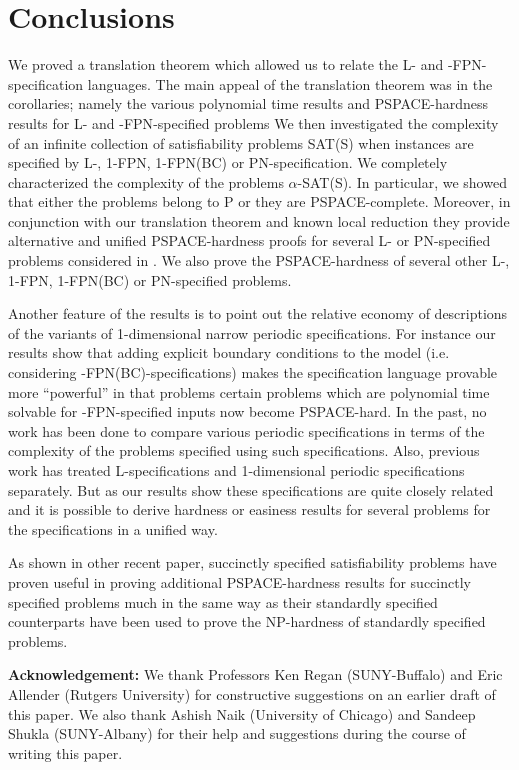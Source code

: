 \section{Conclusions}\label{sec:conclusion}

We proved a translation theorem which allowed us to relate the
{\sf L-} and {-FPN-}specification languages. 
The main appeal of the translation
theorem was in the corollaries; namely the various polynomial time
results and {\sf PSPACE}-hardness results for {\sf L}- and 
{-FPN}-specified problems
We then investigated the complexity of an infinite collection of 
satisfiability problems SAT(S) when instances are specified by 
{\sf L-, 1-FPN, 1-FPN(BC)} or {\sf PN}-specification. 
We completely characterized the
complexity of the problems $\alpha$-{\sf SAT(S)}. In particular, 
we  showed that either the problems belong to
{\sf P} or they are {\sf PSPACE}-complete. 
Moreover, in conjunction with our translation theorem and known local 
reduction they provide alternative and unified {\sf PSPACE}-hardness proofs for
several {\sf L}- or 
{\sf PN}-specified problems considered in \cite{LW92,Or82a}.
We also prove the {\sf PSPACE}-hardness of several other 
{\sf L-, 1-FPN, 1-FPN(BC)} or {\sf PN}-specified problems.  



Another feature of the results is to point out the relative 
economy of descriptions of
the variants of 1-dimensional narrow periodic specifications. For instance our
results show that adding explicit boundary conditions to the model (i.e.
considering {-FPN(BC)}-specifications) makes the specification 
language provable
more ``powerful'' in that problems certain problems which are polynomial time
solvable for {-FPN}-specified inputs now become {\sf PSPACE-hard}. 
In the past,
no work has been done to compare various periodic specifications in terms of
the complexity of the problems specified using such specifications. Also,
previous work has treated {\sf L}-specifications and 1-dimensional periodic 
specifications separately. But as our results show these specifications are
quite closely related and it is possible to derive hardness or easiness results
for several problems for the specifications in a unified way.

As shown in other recent paper, 
succinctly specified satisfiability problems have proven useful in 
proving additional {\sf PSPACE}-hardness results for 
succinctly specified problems much in the same way as their 
standardly specified counterparts have been used to prove the 
{\sf NP}-hardness of  standardly specified problems.







\vspace*{.2in}

\noindent
{\bf Acknowledgement:} We thank
Professors Ken Regan (SUNY-Buffalo) and Eric Allender (Rutgers University)
for constructive suggestions on an earlier draft of this paper.
We also thank Ashish Naik (University of Chicago) and 
Sandeep Shukla (SUNY-Albany) for their help and suggestions during the course
of writing this paper.
